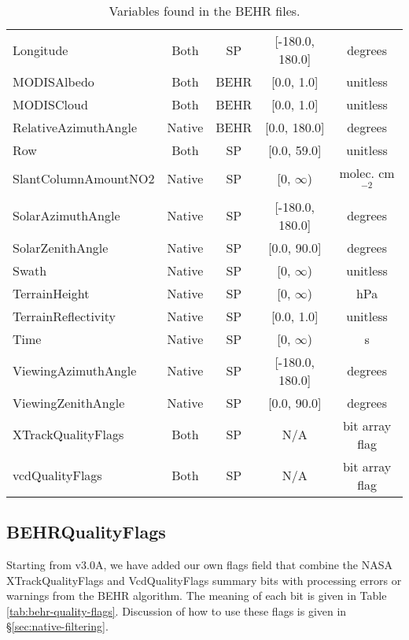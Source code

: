 \documentclass[12pt]{article}
\begin{document}
\begin{table}
\begin{center}
\begin{tabular}{lcccc}
	Longitude			& 	Both 		& 	SP			&	[-180.0, 180.0] & degrees \\
	MODISAlbedo			&	Both		 	&	BEHR			&	[0.0, 1.0]	 & unitless \\
	MODISCloud			&	Both 		&	BEHR			&	[0.0, 1.0]	 & unitless \\
	RelativeAzimuthAngle &	Native	 	&	BEHR			&	[0.0, 180.0] & degrees \\
	Row					&	Both 		&	SP			&   [0.0, 59.0]	& unitless \\
	SlantColumnAmountNO2 & 	Native	 	&	SP			& 	[0, $\infty$) & molec. cm$^{-2}$ \\
	SolarAzimuthAngle	&	Native	 	&	SP			&	[-180.0, 180.0] & degrees \\
	SolarZenithAngle		&	Native	 	&	SP			&	[0.0, 90.0]		& degrees \\
	Swath				&	Native	 	&	SP			&	[0, $\infty$)	& unitless \\
	TerrainHeight		&	Native	 	& 	SP			&	[0, $\infty$) 	& hPa \\
	TerrainReflectivity	&	Native 		&	SP			&	[0.0, 1.0]		& unitless \\
	Time					&	Native	 	&	SP			&	[0, $\infty$)	& s \\
	ViewingAzimuthAngle	&	Native	 	&	SP			&	[-180.0, 180.0]	& degrees \\
	ViewingZenithAngle	&	Native	 	&	SP			&	[0.0, 90.0]		& degrees \\
	XTrackQualityFlags	&	Both 		&	SP			&	N/A				& bit array flag \\
	vcdQualityFlags		&	Both 		&	SP			&	N/A				& bit array flag \\
	\end{tabular}

	\end{center}
	\caption{Variables found in the BEHR files.}
	\label{tab:productvars}
	\end{table}

\subsection{BEHRQualityFlags}\label{sec:behr-quality-flags}
Starting from v3.0A, we have added our own flags field that combine the NASA XTrackQualityFlags and VcdQualityFlags summary bits with processing errors or warnings from the BEHR algorithm. The meaning of each bit is given in Table \ref{tab:behr-quality-flags}. Discussion of how to use these flags is given in \S\ref{sec:native-filtering}.
\end{document}
